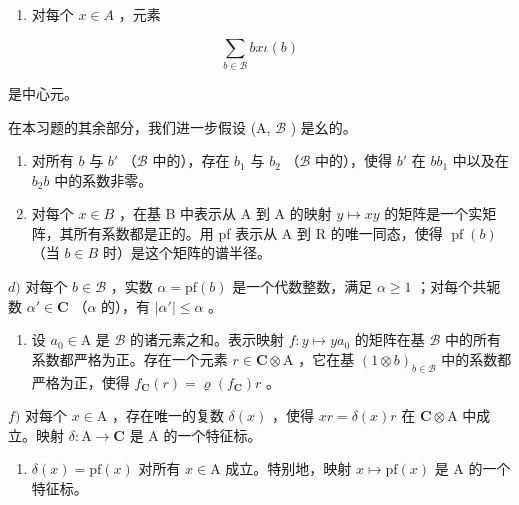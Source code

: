 \begin{enumerate}
\def\labelenumi{\alph{enumi})}
\tightlist
\item
  对每个 \(x \in A\) ，元素
\end{enumerate}

\[
\sum_ {b \in \mathcal {B}} b x \iota (b)
\]

是中心元。

在本习题的其余部分，我们进一步假设 (A, \(\mathcal{B}\) ) 是幺的。

\begin{enumerate}
\def\labelenumi{\alph{enumi})}
\setcounter{enumi}{1}
\item
  对所有 \(b\) 与 \(b'\) （\(\mathcal{B}\) 中的），存在 \(b_1\) 与 \(b_2\) （\(\mathcal{B}\) 中的），使得 \(b'\) 在 \(bb_1\) 中以及在 \(b_2b\) 中的系数非零。
\item
  对每个 \(x \in B\) ，在基 B 中表示从 A 到 A 的映射 \(y \mapsto xy\) 的矩阵是一个实矩阵，其所有系数都是正的。用 pf 表示从 A 到 R 的唯一同态，使得 \(\operatorname{pf}(b)\) （当 \(b \in B\) 时）是这个矩阵的谱半径。
\end{enumerate}

\(d)\) 对每个 \(b \in \mathcal{B}\) ，实数 \(\alpha = \mathrm{pf}(b)\) 是一个代数整数，满足 \(\alpha \geqslant 1\) ；对每个共轭数 \(\alpha' \in \mathbf{C}\) （\(\alpha\) 的），有 \(|\alpha'| \leqslant \alpha\) 。

\begin{enumerate}
\def\labelenumi{\alph{enumi})}
\setcounter{enumi}{4}
\tightlist
\item
  设 \(a_0 \in \mathrm{A}\) 是 \(\mathcal{B}\) 的诸元素之和。表示映射 \(f: y \mapsto ya_0\) 的矩阵在基 \(\mathcal{B}\) 中的所有系数都严格为正。存在一个元素 \(r \in \mathbf{C} \otimes \mathrm{A}\) ，它在基 \((1 \otimes b)_{b \in \mathcal{B}}\) 中的系数都严格为正，使得 \(f_{\mathbf{C}}(r) = \varrho(f_{\mathbf{C}})r\) 。
\end{enumerate}

\(f)\) 对每个 \(x \in \mathrm{A}\) ，存在唯一的复数 \(\delta(x)\) ，使得 \(xr = \delta(x)r\) 在 \(\mathbf{C} \otimes \mathrm{A}\) 中成立。映射 \(\delta: \mathrm{A} \to \mathbf{C}\) 是 \(\mathrm{A}\) 的一个特征标。

\begin{enumerate}
\def\labelenumi{\alph{enumi})}
\setcounter{enumi}{6}
\tightlist
\item
  \(\delta(x) = \mathrm{pf}(x)\) 对所有 \(x \in \mathrm{A}\) 成立。特别地，映射 \(x \mapsto \mathrm{pf}(x)\) 是 A 的一个特征标。
\end{enumerate}


